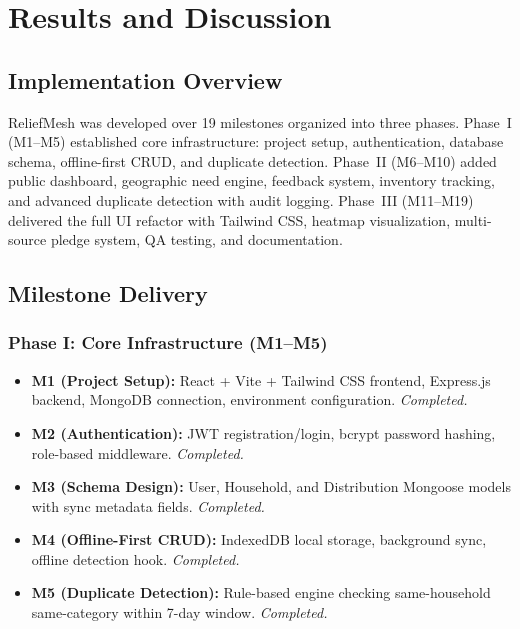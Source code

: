 \chapter{Results and Discussion}

\section{Implementation Overview}

ReliefMesh was developed over 19 milestones organized into three phases. Phase~I (M1--M5) established core infrastructure: project setup, authentication, database schema, offline-first CRUD, and duplicate detection. Phase~II (M6--M10) added public dashboard, geographic need engine, feedback system, inventory tracking, and advanced duplicate detection with audit logging. Phase~III (M11--M19) delivered the full UI refactor with Tailwind CSS, heatmap visualization, multi-source pledge system, QA testing, and documentation.

\section{Milestone Delivery}

\subsection*{Phase I: Core Infrastructure (M1--M5)}
\begin{itemize}[leftmargin=1.2cm]
    \item \textbf{M1 (Project Setup):} React + Vite + Tailwind CSS frontend, Express.js backend, MongoDB connection, environment configuration. \textit{Completed.}
    \item \textbf{M2 (Authentication):} JWT registration/login, bcrypt password hashing, role-based middleware. \textit{Completed.}
    \item \textbf{M3 (Schema Design):} User, Household, and Distribution Mongoose models with sync metadata fields. \textit{Completed.}
    \item \textbf{M4 (Offline-First CRUD):} IndexedDB local storage, background sync, offline detection hook. \textit{Completed.}
    \item \textbf{M5 (Duplicate Detection):} Rule-based engine checking same-household same-category within 7-day window. \textit{Completed.}
\end{itemize}

